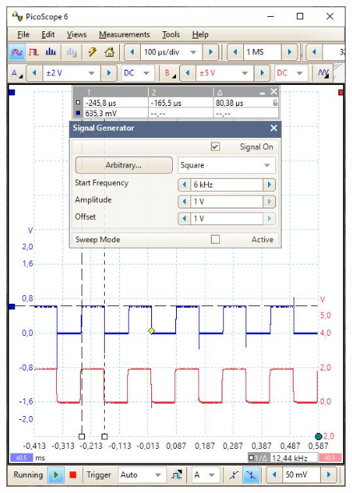 \begin{figure}[H]
	\centering
	\begin{minipage}{.399\linewidth}
		\centering
		\includegraphics[width=\textwidth]{figures/results/power_led_driver/6khz.JPG}
		\label{fig:pwr_led_6k}
	\end{minipage}%
	\hspace{.1\linewidth}
	\begin{minipage}{.399\linewidth}
		\centering

\end{minipage}
\end{figure}
